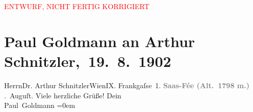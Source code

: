 
\begin{center}
            \textcolor{red}{ENTWURF, NICHT FERTIG KORRIGIERT}
                      \end{center}
            
         \renewcommand{\erwaehnteOrte}{Orte: Frankgasse, Saas-Fee, Wien}
         \renewcommand{\erwaehnteWerke}{}
               \section[ Paul Goldmann an Arthur Schnitzler, 19. 8. 1902]{ Paul Goldmann an Arthur Schnitzler, 19. 8. 1902}\nopagebreak{}\rehead{ }\begin{ledgroupsized}[t]{13cm}\normalsize\beginnumbering \toendnotes[C]{\smallbreak\pagebreak[2]} 
\pstart{}{\pb}Herrn\pend{}\pstart{}Dr. Arthur Schnitzler\pend{}\pstart{}Wien\pend{}\pstart{}IX. Frankgaſse 1.\pend{}{\bigskip}\pstart
           \noindent{}\centering{}{\pb}\textcolor{gray}{\textbf{\textbf{Saas-Fée} (Alt. 1798 m.)}}\pend
           . Auguſt.\pend
           \pstart
           Viele herzliche Grüße!\pend
           \pstart
           Dein {\\[\baselineskip]}\spacefill\mbox{Paul Goldmann}\pend
           \leftskip=0em{}
         
         \endnumbering{}\end{ledgroupsized}  \newcommand{\dateiname}{L03221}\newcommand{\titel}{Paul Goldmann an Arthur Schnitzler, 19. 8. 1902}\newcommand{\editorInnen}{Martin Anton Müller und Laura Untner}
      